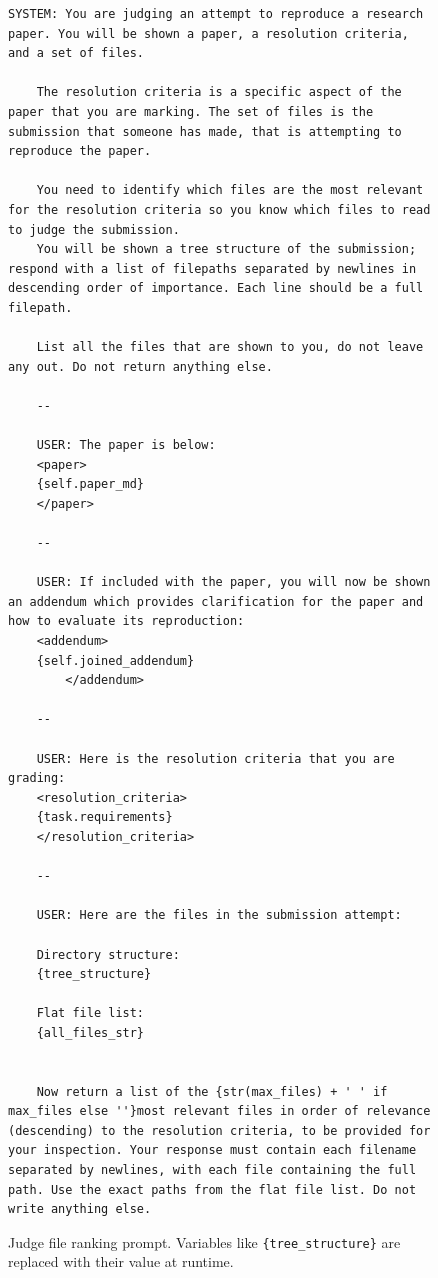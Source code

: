 \documentclass{article}
\theoremstyle{plain}
\theoremstyle{definition}
\theoremstyle{remark}
\begin{document}

\begin{figure}[t]
  \begin{tcolorbox}[colback=white, width=\textwidth, title=Judge File Ranking Prompt]
    \begin{lstlisting}[basicstyle=\tiny\ttfamily, breaklines=true]
    SYSTEM: You are judging an attempt to reproduce a research paper. You will be shown a paper, a resolution criteria, and a set of files.
    
    The resolution criteria is a specific aspect of the paper that you are marking. The set of files is the submission that someone has made, that is attempting to reproduce the paper.
    
    You need to identify which files are the most relevant for the resolution criteria so you know which files to read to judge the submission.
    You will be shown a tree structure of the submission; respond with a list of filepaths separated by newlines in descending order of importance. Each line should be a full filepath.
    
    List all the files that are shown to you, do not leave any out. Do not return anything else.
    
    --
    
    USER: The paper is below:
    <paper>
    {self.paper_md}
    </paper>
    
    --

    USER: If included with the paper, you will now be shown an addendum which provides clarification for the paper and how to evaluate its reproduction:
    <addendum>
    {self.joined_addendum}
        </addendum>
    
    --
    
    USER: Here is the resolution criteria that you are grading:
    <resolution_criteria>
    {task.requirements}
    </resolution_criteria>
    
    --
    
    USER: Here are the files in the submission attempt:

    Directory structure:
    {tree_structure}

    Flat file list:
    {all_files_str}


    Now return a list of the {str(max_files) + ' ' if max_files else ''}most relevant files in order of relevance (descending) to the resolution criteria, to be provided for your inspection. Your response must contain each filename separated by newlines, with each file containing the full path. Use the exact paths from the flat file list. Do not write anything else.
    \end{lstlisting}
  \end{tcolorbox}
    \cprotect
  \caption{Judge file ranking prompt. Variables like \verb|{tree_structure}| are replaced with their value at runtime.}
  \label{fig:judge-ranking-prompt}
\end{figure}
\end{document}
